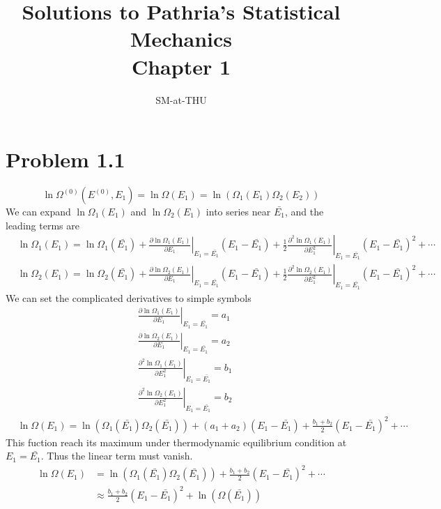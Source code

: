 \documentclass{article}
\author{SM-at-THU}
\title{\bf{Solutions to Pathria's Statistical Mechanics}\\Chapter 1}
\begin{document}
\maketitle
\section*{Problem 1.1}
\begin{equation}
\ln\Omega^{(0)}(E^{(0)},E_1)=\ln\Omega(E_1)=\ln(\Omega_1(E_1)\Omega_2(E_2))
\end{equation}
We can expand $\ln\Omega_1(E_1)$ and $\ln\Omega_2(E_1)$ into series near $\bar{E_1}$, and the leading terms are
\begin{align}
&\ln\Omega_1(E_1)=\ln\Omega_1(\bar{E_1})+\left. \frac{\partial \ln\Omega_1(E_1)}{\partial E_1}\right|_{E_1=\bar{E_1}}(E_1-\bar{E_1})+\frac{1}{2}\left. \frac{\partial^2 \ln\Omega_1(E_1)}{\partial E_1^2}\right|_{E_1=\bar{E_1}}(E_1-\bar{E_1})^2+\cdots\\
&\ln\Omega_2(E_1)=\ln\Omega_2(\bar{E_1})+\left. \frac{\partial \ln\Omega_2(E_1)}{\partial E_1}\right|_{E_1=\bar{E_1}}(E_1-\bar{E_1})+\frac{1}{2}\left. \frac{\partial^2 \ln\Omega_2(E_1)}{\partial E_1^2}\right|_{E_1=\bar{E_1}}(E_1-\bar{E_1})^2+\cdots
\end{align}
We can set the complicated derivatives to simple symbols
\begin{align}
&\left. \frac{\partial \ln\Omega_1(E_1)}{\partial E_1}\right|_{E_1=\bar{E_1}}=a_1\\
&\left. \frac{\partial \ln\Omega_2(E_1)}{\partial E_1}\right|_{E_1=\bar{E_1}}=a_2\\
&\left. \frac{\partial^2 \ln\Omega_1(E_1)}{\partial E_1^2}\right|_{E_1=\bar{E_1}}=b_1\\
&\left. \frac{\partial^2 \ln\Omega_2(E_1)}{\partial E_1^2}\right|_{E_1=\bar{E_1}}=b_2
\end{align}
\begin{align}
&\ln\Omega(E_1)=\ln(\Omega_1(\bar{E_1})\Omega_2(\bar{E_1}))+(a_1+a_2)(E_1-\bar{E_1})+\frac{b_1+b_2}{2}(E_1-\bar{E_1})^2+\cdots
\end{align}
This fuction reach its maximum under thermodynamic equilibrium condition at $E_1=\bar{E_1}$. Thus the linear term must vanish.
\begin{align}
\ln\Omega(E_1)&=\ln(\Omega_1(\bar{E_1})\Omega_2(\bar{E_1}))+\frac{b_1+b_2}{2}(E_1-\bar{E_1})^2+\cdots\\
&\approx \frac{b_1+b_2}{2}(E_1-\bar{E_1})^2+\ln(\Omega(\bar{E_1}))
\end{align}
\end{document}
